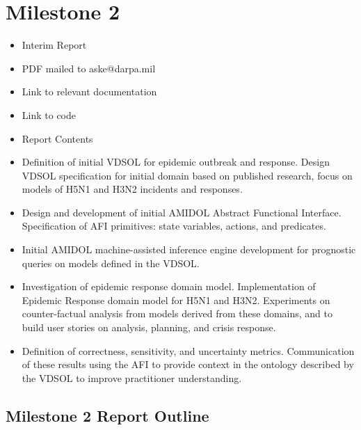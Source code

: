 \section{Milestone 2}\label{milestone-2}

\begin{itemize}
\item
  Interim Report
\item
  PDF mailed to aske@darpa.mil
\item
  Link to relevant documentation
\item
  Link to code
\item
  Report Contents
\item
  Definition of initial VDSOL for epidemic outbreak and response. Design
  VDSOL specification for initial domain based on published research,
  focus on models of H5N1 and H3N2 incidents and responses.
\item
  Design and development of initial AMIDOL Abstract Functional
  Interface. Specification of AFI primitives: state variables, actions,
  and predicates.
\item
  Initial AMIDOL machine-assisted inference engine development for
  prognostic queries on models defined in the VDSOL.
\item
  Investigation of epidemic response domain model. Implementation of
  Epidemic Response domain model for H5N1 and H3N2. Experiments on
  counter-factual analysis from models derived from these domains, and
  to build user stories on analysis, planning, and crisis response.
\item
  Definition of correctness, sensitivity, and uncertainty metrics.
  Communication of these results using the AFI to provide context in the
  ontology described by the VDSOL to improve practitioner understanding.
\end{itemize}

\subsection{Milestone 2 Report
Outline}\label{milestone-2-report-outline}

